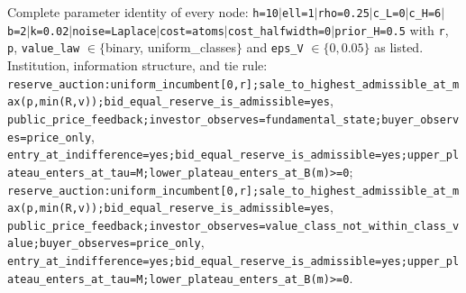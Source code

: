 \begin{landscape}
\begin{table}[tbp]
\begin{threeparttable}
\begin{tablenotes}
\item {\raggedright Complete parameter identity of every node: \texttt{h=\allowbreak{}10$|$\allowbreak{}ell=\allowbreak{}1$|$\allowbreak{}rho=\allowbreak{}0.25$|$\allowbreak{}c\_\allowbreak{}L=\allowbreak{}0$|$\allowbreak{}c\_\allowbreak{}H=\allowbreak{}6$|$\allowbreak{}b=\allowbreak{}2$|$\allowbreak{}k=\allowbreak{}0.02$|$\allowbreak{}noise=\allowbreak{}Laplace$|$\allowbreak{}cost=\allowbreak{}atoms$|$\allowbreak{}cost\_\allowbreak{}halfwidth=\allowbreak{}0$|$\allowbreak{}prior\_\allowbreak{}H=\allowbreak{}0.5} with \texttt{r}, \texttt{p}, \texttt{value\_law} $\in\{$binary, uniform\_classes$\}$ and \texttt{eps\_V} $\in\{0, 0.05\}$ as listed. Institution, information structure, and tie rule: \texttt{reserve\_\allowbreak{}auction:uniform\_\allowbreak{}incumbent[0,r];\allowbreak{}sale\_\allowbreak{}to\_\allowbreak{}highest\_\allowbreak{}admissible\_\allowbreak{}at\_\allowbreak{}max(p,min(R,v));\allowbreak{}bid\_\allowbreak{}equal\_\allowbreak{}reserve\_\allowbreak{}is\_\allowbreak{}admissible=\allowbreak{}yes}, \texttt{public\_\allowbreak{}price\_\allowbreak{}feedback;\allowbreak{}investor\_\allowbreak{}observes=\allowbreak{}fundamental\_\allowbreak{}state;\allowbreak{}buyer\_\allowbreak{}observes=\allowbreak{}price\_\allowbreak{}only}, \texttt{entry\_\allowbreak{}at\_\allowbreak{}indifference=\allowbreak{}yes;\allowbreak{}bid\_\allowbreak{}equal\_\allowbreak{}reserve\_\allowbreak{}is\_\allowbreak{}admissible=\allowbreak{}yes;\allowbreak{}upper\_\allowbreak{}plateau\_\allowbreak{}enters\_\allowbreak{}at\_\allowbreak{}tau=\allowbreak{}M;\allowbreak{}lower\_\allowbreak{}plateau\_\allowbreak{}enters\_\allowbreak{}at\_\allowbreak{}B(m)>=\allowbreak{}0}; \texttt{reserve\_\allowbreak{}auction:uniform\_\allowbreak{}incumbent[0,r];\allowbreak{}sale\_\allowbreak{}to\_\allowbreak{}highest\_\allowbreak{}admissible\_\allowbreak{}at\_\allowbreak{}max(p,min(R,v));\allowbreak{}bid\_\allowbreak{}equal\_\allowbreak{}reserve\_\allowbreak{}is\_\allowbreak{}admissible=\allowbreak{}yes}, \texttt{public\_\allowbreak{}price\_\allowbreak{}feedback;\allowbreak{}investor\_\allowbreak{}observes=\allowbreak{}value\_\allowbreak{}class\_\allowbreak{}not\_\allowbreak{}within\_\allowbreak{}class\_\allowbreak{}value;\allowbreak{}buyer\_\allowbreak{}observes=\allowbreak{}price\_\allowbreak{}only}, \texttt{entry\_\allowbreak{}at\_\allowbreak{}indifference=\allowbreak{}yes;\allowbreak{}bid\_\allowbreak{}equal\_\allowbreak{}reserve\_\allowbreak{}is\_\allowbreak{}admissible=\allowbreak{}yes;\allowbreak{}upper\_\allowbreak{}plateau\_\allowbreak{}enters\_\allowbreak{}at\_\allowbreak{}tau=\allowbreak{}M;\allowbreak{}lower\_\allowbreak{}plateau\_\allowbreak{}enters\_\allowbreak{}at\_\allowbreak{}B(m)>=\allowbreak{}0}.\par}

\end{tablenotes}
\end{threeparttable}
\end{table}
\end{landscape}

